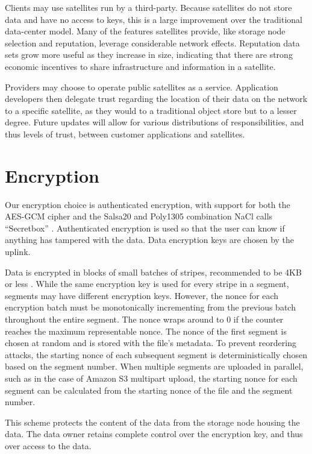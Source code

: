 \documentclass[11pt,fleqn,openany]{book}
\begin{document}
Clients may use satellites run by a third-party. Because satellites do not store
data and have no access to keys, this is a large improvement over the
traditional data-center model. Many of the features satellites provide, like
storage node selection and reputation, leverage considerable network effects.
Reputation data sets grow more useful as they increase in size,
indicating that there are strong economic incentives to share infrastructure
and information in a satellite.

Providers may choose to operate public satellites as a service.
Application developers then delegate trust regarding the location of their
data on the network to a specific satellite, as they
would to a traditional object store but to a lesser degree. Future updates
will allow for various distributions of responsibilities, and thus levels of
trust, between customer applications and satellites.

\section{Encryption}\label{sec:concrete-encryption}

Our encryption choice is authenticated encryption, with support for both the
AES-GCM cipher and the Salsa20 and Poly1305 combination NaCl calls ``Secretbox''
\cite{nacl-crypto}. Authenticated encryption is used so that the user can know
if anything has tampered with the data. Data encryption keys are chosen by the
uplink.

Data is encrypted in blocks of small batches of stripes, recommended to be
4KB or less \cite{nacl-packetlen}. While the same encryption key is used for
every stripe in a segment, segments may have
different encryption keys. However, the nonce for each encryption
batch must be monotonically incrementing from the previous batch throughout the
entire segment. The nonce wraps around to 0 if the counter reaches the
maximum representable nonce.
The nonce of the first segment is chosen at random and is stored with the
file's metadata. To prevent reordering attacks, the starting nonce of each
subsequent segment is deterministically chosen based on the segment number.
When multiple segments are uploaded in parallel, such as in the case of
Amazon S3 multipart upload, the starting nonce for each segment can be
calculated from the starting nonce of the file and the segment number.

This scheme protects the
content of the data from the storage node housing the data. The data owner
retains complete control over the encryption key, and thus over access to the
data.
\end{document}
